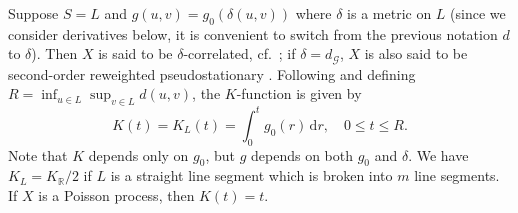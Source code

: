 \documentclass[alpha-refs]{wiley-article}
\begin{document}
Suppose $S=L$ and $g(u,v)=g_0(\delta(u,v))$ where $\delta$ is a metric on $L$ (since we consider derivatives below, it is convenient to switch from the previous notation $d$ to $\delta$). Then $X$ is said to be $\delta$-correlated, cf.\ \citet{RakshitEtAl}; if  $\delta=d_{\mathcal G}$, $X$ is also said to be second-order reweighted pseudostationary \citep{AngEtAl}.
Following \citet{RakshitEtAl} and defining $R=\inf_{u\in L}\sup_{v\in L}d(u,v)$, 
the $K$-function is given by
\begin{equation}\label{e:K2new}
K(t)=K_L(t)=\int_0^t g_0(r)\,\mathrm dr,\quad 0\le t\le R.
\end{equation}
Note that $K$ depends only on $g_0$, but $g$ depends on both $g_0$ and $\delta$.
We have $K_L=K_{\mathbb R}/2$ 
if $L$ is a straight line segment which is broken into $m$ line segments. If $X$ is a Poisson process, then $K(t)=t$.
\end{document}
